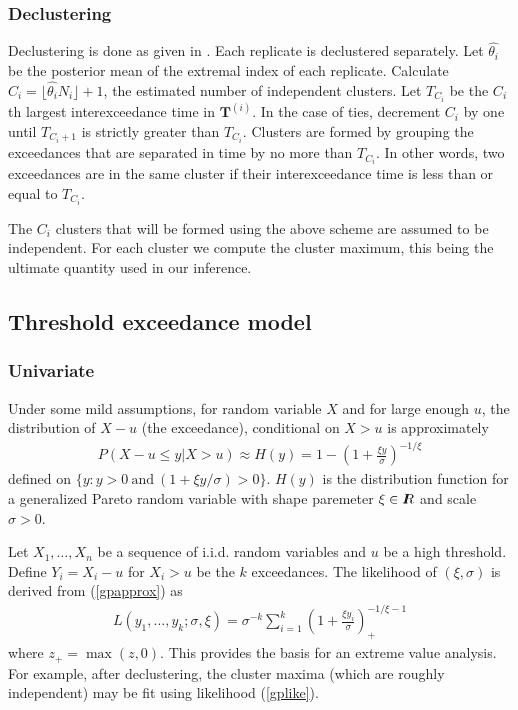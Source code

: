 \documentclass[12pt]{article}
\newcommand{\m}[1]{\mathbf{\bm{#1}}}
\newcommand{\R}{I\hspace{-4.4pt}R}
\begin{document}
\subsubsection{Declustering}

Declustering is done as given in \cite{ferro2003inference}. Each replicate is declustered separately. Let $\hat{\theta_i}$ be the posterior mean of the extremal index of each replicate. Calculate $C_i=\lfloor \hat{\theta_i} N_i \rfloor + 1$, the estimated number of independent clusters. Let $T_{C_i}$ be the $C_i$th largest interexceedance time in $\m{T}^{(i)}$. In the case of ties, decrement $C_i$ by one until $T_{C_i+1}$ is strictly greater than $T_{C_i}$. Clusters are formed by grouping the exceedances that are separated in time by no more than $T_{C_i}$. In other words, two exceedances are in the same cluster if their interexceedance time is less than or equal to $T_{C_i}$.

The $C_i$ clusters that will be formed using the above scheme are assumed to be independent. For each cluster we compute the cluster maximum, this being the ultimate quantity used in our inference.



\subsection{Threshold exceedance model}
\label{thresh}

\subsubsection{Univariate}
\label{univariate}

Under some mild assumptions, for random variable $X$ and for large enough $u$, the distribution of $X-u$ (the exceedance), conditional on $X>u$ is approximately
\begin{align}
P(X-u\leq y|X>u) \approx H(y) = 1 - \left(1+\frac{\xi y}{\sigma}\right)^{-1/\xi} \label{gpapprox}
\end{align}
defined on $\{y:y>0~\mathrm{and}~(1+\xi y/\sigma) >0\}$. $H(y)$ is the distribution function for a generalized Pareto random variable with shape paremeter $\xi\in\R$ and scale $\sigma>0$.

Let $X_1,\ldots,X_n$ be a sequence of i.i.d. random variables and $u$ be a high threshold. Define $Y_i=X_i-u$ for $X_i>u$ be the $k$ exceedances. The likelihood of $(\xi,\sigma)$ is derived from (\ref{gpapprox}) as
\begin{align}
L(y_1,\ldots,y_k;\sigma,\xi)=\sigma^{-k}\sum_{i=1}^k\left(1+\frac{\xi y_i}{\sigma}\right)_+^{-1/\xi-1} \label{gplike}
\end{align}
where $z_+=\max(z,0)$. This provides the basis for an extreme value analysis. For example, after declustering, the cluster maxima (which are roughly independent) may be fit using likelihood (\ref{gplike}).
\end{document}
